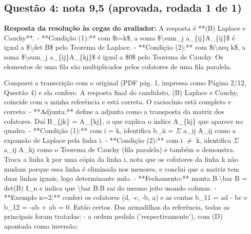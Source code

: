 \documentclass{article}%
\begin{document}
\subsection*{Questão 4: nota 9,5 (aprovada, rodada 1 de 1)}%
\textbf{Resposta da resolução às cegas do avaliador:} A resposta é **(B) Laplace e Cauchy**.\newline%
{-} **Condição (1):** com \$i=k\$, a soma \$\textbackslash{}sum\_j a\_\{ij\}A\_\{ij\}\$ é igual a \$\textbackslash{}det B\$ pelo Teorema de Laplace.\newline%
{-} **Condição (2):** com \$i\textbackslash{}neq k\$, a soma \$\textbackslash{}sum\_j a\_\{ij\}A\_\{kj\}\$ é igual a \$0\$ pelo Teorema de Cauchy. Os elementos de uma fila são multiplicados pelos cofatores de uma fila paralela.\par %
Comparei a transcrição com o original (PDF pág. 1, impressa como Página 2/12, Questão 4) e ela confere. A resposta final do candidato, (B) Laplace e Cauchy, coincide com a minha referência e está correta.\newline%
\newline%
O raciocínio está completo e correto:\newline%
{-} **Adjunta:** define a adjunta como a transposta da matriz dos cofatores. Daí B\_\{jk\} = A\_\{kj\}, o que explica o índice A\_\{kj\} que aparece no quadro.\newline%
{-} **Condição (1):** com i = k, identifica b\_ii = $\Sigma$ a\_ij A\_ij como a expansão de Laplace pela linha i.\newline%
{-} **Condição (2):** com i $\neq$ k, identifica $\Sigma$ a\_ij A\_kj como o Teorema de Cauchy (fila paralela) e também o demonstra. Troca a linha k por uma cópia da linha i, nota que os cofatores da linha k não mudam porque essa linha é eliminada nos menores, e conclui que a matriz tem duas linhas iguais, logo determinante nulo.\newline%
{-} **Fechamento:** monta B$\cdot$\textbackslash{}bar B = det(B) I\_n e indica que \textbackslash{}bar B$\cdot$B sai do mesmo jeito usando colunas.\newline%
{-} **Exemplo n=2:** conferi os cofatores (d, -c, -b, a) e as contas b\_11 = ad - bc e b\_12 = -ab + ab = 0. Estão certos.\newline%
\newline%
Das armadilhas da referência, todas as principais foram tratadas:\newline%
{-} a ordem pedida ('respectivamente'), com (D) apontada como inversão;\newline%
\end{document}
